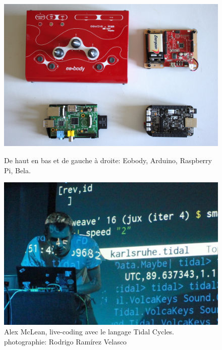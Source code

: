 \begin{figure}[!htbp]
	\captionsetup{format=plain}%
	\centering
	\begin{minipage}[t]{0.48\textwidth}
		\includegraphics[width=\linewidth]{gfx/02_ephemeral/Eobody-arduino-raspi-bela_144px.jpg}
		\caption[Eobody, Arduino, Raspberry Pi, Bela]{De haut en bas et de gauche à droite: Eobody, Arduino, Raspberry Pi, Bela.}
		\label{fig:ephemeral:DIY-devices}
	\end{minipage}
	\hspace{.02\linewidth}
	\begin{minipage}[t]{0.48\textwidth}
	  \includegraphics[width=\linewidth]{gfx/02_ephemeral/alex_mclean_144px.jpg}
		\caption[Alex McLean, live-coding avec le langage Tidal Cycles. © Rodrigo Ramírez Velasco]{Alex McLean, live-coding avec le langage Tidal Cycles.\\ photographie: Rodrigo Ramírez Velasco}
		\label{fig:ephemeral:livecoding}
	\end{minipage}
\end{figure}


